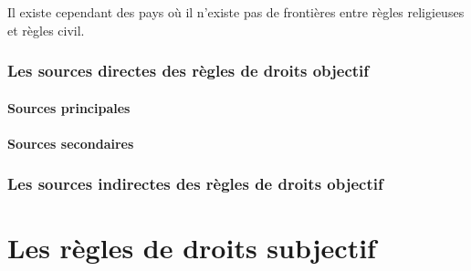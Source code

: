 \documentclass[12pt, a4paper, openany]{book}
\begin{document}
Il existe cependant des pays où il n'existe pas de frontières entre règles religieuses et règles civil.

\section{Les sources directes des règles de droits objectif}

\subsection{Sources principales}

\subsection{Sources secondaires}

\section{Les sources indirectes des règles de droits objectif}

\part{Les règles de droits subjectif}
\end{document}
